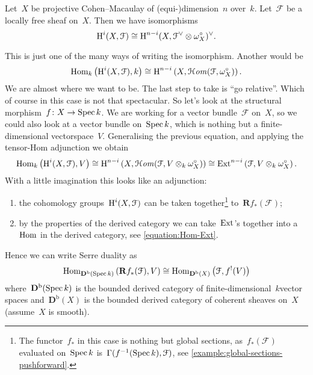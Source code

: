 \documentclass[10pt,a4paper]{article}
\begin{document}
\begin{corollary}
  Let~$X$ be projective Cohen--Macaulay of (equi-)dimension~$n$ over~$k$. Let~$\mathcal{F}$ be a locally free sheaf on~$X$. Then we have isomorphisms
  \begin{equation}
    \operatorname{H}^i(X,\mathcal{F})\cong\operatorname{H}^{n-i}(X,\mathcal{F}^\vee\otimes\omega_X^\circ)^\vee.
  \end{equation}
\end{corollary}
This is just one of the many ways of writing the isomorphism. Another would be
\begin{equation}
  \operatorname{Hom}_k\left( \operatorname{H}^i(X,\mathcal{F}),k \right)\cong\operatorname{H}^{n-i}\left( X,\operatorname{\mathcal{H}\mathit{om}}(\mathcal{F},\omega_X^\circ) \right).
\end{equation}
We are almost where we want to be. The last step to take is ``go relative''. Which of course in this case is not that spectacular. So let's look at the structural morphism~$f\colon X\to\operatorname{Spec} k$. We are working for a vector bundle~$\mathcal{F}$ on~$X$, so we could also look at a vector bundle on~$\operatorname{Spec} k$, which is nothing but a finite-dimensional vectorspace~$V$. Generalising the previous equation, and applying the tensor-Hom adjunction we obtain
\begin{equation}
  \operatorname{Hom}_k\left( \operatorname{H}^i(X,\mathcal{F}),V \right)\cong\operatorname{H}^{n-i}\left( X,\operatorname{\mathcal{H}\mathit{om}}(\mathcal{F},V\otimes_k\omega_X^\circ) \right)\cong\operatorname{Ext}^{n-i}\left( \mathcal{F},V\otimes_k\omega_X^\circ \right).
\end{equation}
With a little imagination this looks like an adjunction:
\begin{enumerate}
  \item the cohomology groups~$\operatorname{H}^i(X,\mathcal{F})$ can be taken together\footnote{The functor~$f_*$ in this case is nothing but global sections, as~$f_*(\mathcal{F})$ evaluated on~$\operatorname{Spec} k$ is~$\Gamma(f^{-1}(\operatorname{Spec} k),\mathcal{F})$, see \cref{example:global-sections-pushforward}.} to~$\mathbf{R}f_*(\mathcal{F})$;
  \item by the properties of the derived category we can take~$\operatorname{Ext}$'s together into a~$\operatorname{Hom}$ in the derived category, see \eqref{equation:Hom-Ext}.
\end{enumerate}
Hence we can write Serre duality as
\begin{equation}
  \operatorname{Hom}_{\mathbf{D}^{\mathrm{b}}(\operatorname{Spec} k)}\left( \mathbf{R}f_*(\mathcal{F}),V \right)\cong\operatorname{Hom}_{\mathbf{D}^{\mathrm{b}}(X)}\left( \mathcal{F},f^!(V) \right)
\end{equation}
where~$\mathbf{D}^{\mathrm{b}}(\operatorname{Spec} k)$ is the bounded derived category of finite-dimensional~$k$\dash vector spaces and~$\mathbf{D}^{\mathrm{b}}(X)$ is the bounded derived category of coherent sheaves on~$X$ (assume~$X$ is smooth).
\end{document}
